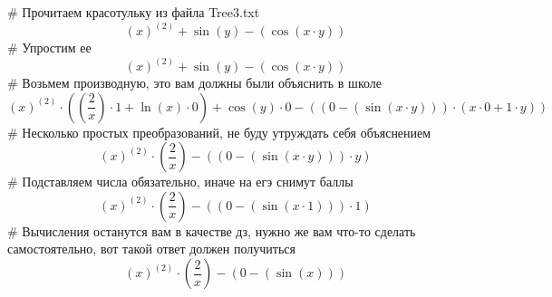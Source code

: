 # Прочитаем красотульку из файла Tree3.txt
$${ { {\left(x\right)}^{\left(2\right)} }+{ \sin{\left(y\right)} } }-{\left(\cos{\left({ x }\cdot{ y }\right)}\right)}$$
# Упростим ее
$${ { {\left(x\right)}^{\left(2\right)} }+{ \sin{\left(y\right)} } }-{\left(\cos{\left({ x }\cdot{ y }\right)}\right)}$$
# Возьмем производную, это вам должны были объяснить в школе
$${ { { {\left(x\right)}^{\left(2\right)} }\cdot{\left({ {\left(\frac{ 2 }{ x }\right)}\cdot{ 1 } }+{ { \ln{\left(x\right)} }\cdot{ 0 } }\right)} }+{ { \cos{\left(y\right)} }\cdot{ 0 } } }-{\left({\left({ 0 }-{\left(\sin{\left({ x }\cdot{ y }\right)}\right)}\right)}\cdot{\left({ { x }\cdot{ 0 } }+{ { 1 }\cdot{ y } }\right)}\right)}$$
# Несколько простых преобразований, не буду утруждать себя объяснением
$${ { {\left(x\right)}^{\left(2\right)} }\cdot{\left(\frac{ 2 }{ x }\right)} }-{\left({\left({ 0 }-{\left(\sin{\left({ x }\cdot{ y }\right)}\right)}\right)}\cdot{ y }\right)}$$
# Подставляем числа обязательно, иначе на егэ снимут баллы
$${ { {\left(x\right)}^{\left(2\right)} }\cdot{\left(\frac{ 2 }{ x }\right)} }-{\left({\left({ 0 }-{\left(\sin{\left({ x }\cdot{ 1 }\right)}\right)}\right)}\cdot{ 1 }\right)}$$
# Вычисления останутся вам в качестве дз, нужно же вам что-то сделать самостоятельно, вот такой ответ должен получиться
$${ { {\left(x\right)}^{\left(2\right)} }\cdot{\left(\frac{ 2 }{ x }\right)} }-{\left({ 0 }-{\left(\sin{\left(x\right)}\right)}\right)}$$
